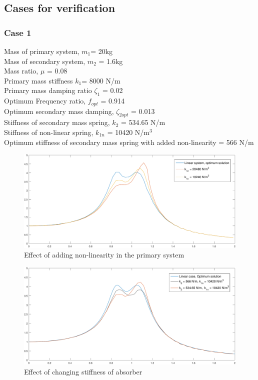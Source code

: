 \subsection{Cases for verification}
\subsubsection{Case 1}
Mass of primary system, $m_1$= 20kg\\
Mass of secondary system, $m_2$ = 1.6kg\\
Mass ratio, $\mu$ = 0.08\\
Primary mass stiffness $k_1$= 8000 N/m\\
Primary mass damping ratio $\zeta_1$ = 0.02\\
Optimum Frequency ratio, $f_{opt}$ = 0.914\\
Optimum secondary mass damping, $\zeta_{2opt}$ = 0.013\\
Stiffness of secondary mass spring, $k_2$ = 534.65 N/m \\
Stiffness of non-linear spring, $k_{1n}$ = 10420 N/m$^3$\\
Optimum stiffness of secondary mass spring with added non-linearity = 566 N/m
\begin{figure}[h!]
\includegraphics[width=\textwidth, height = 0.5\textwidth]{"figures/2addingNonlinearity"}
\caption{Effect of adding non-linearity in the primary system}
\end{figure}

\begin{figure}[h!]
\includegraphics[width=\textwidth, height = 0.5\textwidth]{"figures/2changingk2"}
\caption{Effect of changing stiffness of absorber}
\end{figure}

